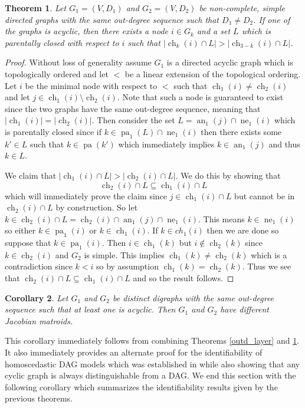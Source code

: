 \documentclass[12pt,reqno]{amsart}
\theoremstyle{plain}
\newtheorem{theorem}{Theorem}[section]
\newtheorem{corollary}[theorem]{Corollary}
\theoremstyle{definition}
\DeclareMathOperator{\pa}{pa}
\DeclareMathOperator{\an}{an}
\DeclareMathOperator{\ch}{ch}
\DeclareMathOperator{\neighbors}{ne}
\begin{document}
\begin{theorem}
\label{thm:difGraphsPC_Set}
Let $G_1 = (V, D_1)$ and $G_2 = (V, D_2)$ be non-complete, simple directed graphs with the same out-degree sequence such that $D_1 \neq D_2$. If one of the graphs is acyclic, then there exists a node $i \in G_k$ and a set $L$ which is parentally closed with respect to $i$ such that $|\ch_{k}(i)\cap L|>|\ch_{3-k}(i)\cap L|$. 
\end{theorem}
\begin{proof}
Without loss of generality assume $G_1$ is a directed acyclic graph which is topologically ordered and let $<$ be a linear extension of the topological ordering. Let $i$ be the minimal node with respect to $<$ such that $\ch_1(i) \neq \ch_2(i)$ and let $j \in \ch_1(i) \setminus \ch_2(i)$. Note that such a node is guaranteed to exist since the two graphs have the same out-degree sequence, meaning that $|\ch_1(i)| = |\ch_2(i)|$. Then consider the set $L = \an_1(j) \cap \neighbors_1(i)$ which is parentally closed since if $k \in \pa_1(L) \cap \neighbors_1(i)$ then there exists some $k' \in L$ such that $k \in \pa(k')$ which immediately implies $k \in \an_1(j)$ and thus $k \in L$. 

We claim that $|\ch_{1}(i)\cap L|>|\ch_{2}(i)\cap L|$. We do this by showing that
\[
\ch_2(i) \cap L \subseteq \ch_1(i) \cap L
\]
which will immediately prove the claim since $j \in \ch_{1}(i)\cap L$ but cannot be in $\ch_{2}(i)\cap L$ by construction. So let $k \in \ch_2(i) \cap L = \ch_2(i) \cap \an_1(j) \cap \neighbors_1(i)$. This means $k \in \neighbors_1(i)$ so either $k \in \pa_1(i)$ or $k \in \ch_1(i)$. If $k \in ch_1(i)$ then we are done so suppose that $k \in \pa_1(i)$. Then $i \in \ch_1(k)$ but $i \notin \ch_2(k)$ since $k \in \ch_2(i)$ and $G_2$ is simple. This implies $\ch_1(k) \neq \ch_2(k)$ which is a contradiction since $k < i$ so by assumption $\ch_1(k) = \ch_2(k)$. Thus we see that $\ch_2(i) \cap L \subseteq \ch_1(i) \cap L$
and so the result follows. 
\end{proof}

\begin{corollary}
Let $G_1$ and $G_2$ be distinct digraphs with the same out-degree sequence such that at least one is acyclic. Then $G_1$ and $G_2$ have different Jacobian matroids. 
\end{corollary}

This corollary immediately follows from combining Theorems \ref{outd_layer} and \ref{thm:difGraphsPC_Set}. It also immediately provides an alternate proof for the identifiability of homoscedastic DAG models which was established in \cite{ideneqPeters,eqvar/biomet/asz049} while also showing that any cyclic graph is always distinguishable from a DAG. We end this section with the following corollary which summarizes the identifiability results given by the previous theorems. 
\end{document}
